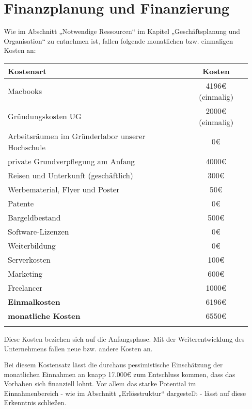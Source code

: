 \chapter{Finanzplanung und Finanzierung}

Wie im Abschnitt „Notwendige Ressourcen“ im Kapitel „Geschäftsplanung und Organisation“ zu entnehmen ist, fallen folgende monatlichen bzw. einmaligen Kosten an: \\

\begin{tabular}{lc}
  \textbf{Kostenart} & \textbf{Kosten} \\
  \hline
  Macbooks & 4196{\euro} (einmalig) \\
  Gründungskosten UG & 2000{\euro} (einmalig) \\
  Arbeitsräumen im Gründerlabor unserer Hochschule & 0\euro \\
  private Grundverpflegung am Anfang & 4000\euro \\
  Reisen und Unterkunft (geschäftlich) & 300\euro \\
  Werbematerial, Flyer und Poster & 50\euro \\
  Patente & 0\euro \\
  Bargeldbestand & 500\euro \\
  Software-Lizenzen & 0\euro \\
  Weiterbildung & 0\euro \\
  Serverkosten & 100\euro \\
  Marketing & 600\euro \\
  Freelancer & 1000\euro \\
  \hline
  \textbf{Einmalkosten} & 6196{\euro} \\
  \textbf{monatliche Kosten} & 6550\euro \\
  \hline  \\
 \end{tabular}

Diese Kosten beziehen sich auf die Anfangsphase. Mit der Weiterentwicklung des Unternehmens fallen neue bzw. andere Kosten an.

Bei diesem Kostensatz lässt die durchaus pessimistische Einschätzung der monatlichen Einnahmen an knapp 17.000{\euro} zum Entschluss kommen, dass das Vorhaben sich finanziell lohnt. Vor allem das starke Potential im Einnahmenbereich - wie im Abschnitt „Erlösstruktur“ dargestellt - lässt auf diese Erkenntnis schließen.

